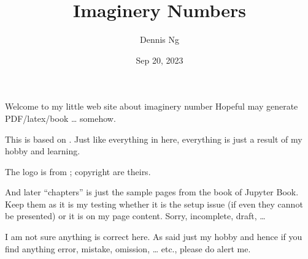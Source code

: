 \documentclass[letterpaper,10pt,english]{jupyterBook}
\title{Imaginery Numbers}
\date{Sep 20, 2023}
\author{Dennis Ng}
\begin{document}
\pagestyle{empty}
\sphinxmaketitle
\pagestyle{plain}
\sphinxtableofcontents
\pagestyle{normal}
\label{\detokenize{MacTwgssA0-intro::doc}}


\sphinxAtStartPar
Welcome to my little web site about imaginery number
Hopeful may generate PDF/latex/book … somehow.

\sphinxAtStartPar
This is based on .  Just like everything in here, everything is just a result of my hobby and learning.

\sphinxAtStartPar
The logo is from ; copyright are theirs.

\sphinxAtStartPar
And later “chapters” is just the sample pages from the book of Jupyter Book.  Keep them as it is my testing whether it is the setup issue (if even they cannot be presented) or it is on my page content.  Sorry, incomplete, draft, …

\begin{DUlineblock}{0em}
\item[] 
\end{DUlineblock}

\sphinxAtStartPar
I am not sure anything is correct here.  As said just my hobby and hence if you find anything error, mistake, omission, … etc., please do alert me.
\end{document}
